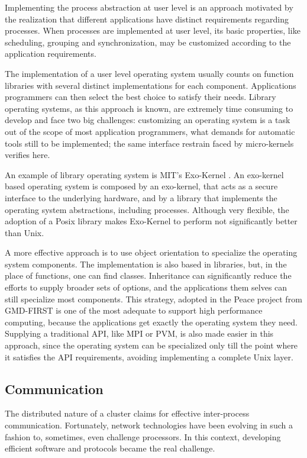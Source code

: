 	Implementing the process abstraction at user level is an approach motivated by the realization that different applications have distinct requirements regarding processes. When processes are implemented at user level, its basic properties, like scheduling, grouping and synchronization, may be customized according to the application requirements.
	
	The implementation of a user level operating system usually counts on function libraries with several distinct implementations for each component. Applications programmers can then select the best choice to satisfy their needs. Library operating systems, as this approach is known, are extremely time consuming to develop and face two big challenges: customizing an operating system is a task out of the scope of most application programmers, what demands for automatic tools still to be implemented; the same interface restrain faced by micro-kernels verifies here.
	
	An example of library operating system is MIT's Exo-Kernel \cite{Engler:95}. An exo-kernel based operating system is composed by an exo-kernel, that acts as a secure interface to the underlying hardware, and by a library that implements the operating system abstractions, including processes. Although very flexible, the adoption of a Posix library makes Exo-Kernel to perform not significantly better than Unix.
	
	A more effective approach is to use object orientation to specialize the operating system components. The implementation is also based in libraries, but, in the place of functions, one can find classes. Inheritance can significantly reduce the efforts to supply broader sets of options, and the applications them selves can still specialize most components. This strategy, adopted in the Peace project from GMD-FIRST is one of the most adequate to support high performance computing, because the applications get exactly the operating system they need. Supplying a traditional API, like MPI or PVM, is also made easier in this approach, since the operating system can be specialized only till the point where it satisfies the API requirements, avoiding implementing a complete Unix layer.


\subsection{\label{soft_comm}Communication}

	The distributed nature of a cluster claims for effective inter-process communication. Fortunately, network technologies have been evolving in such a fashion to, sometimes, even challenge processors. In this context, developing efficient software and protocols became the real challenge.
	
